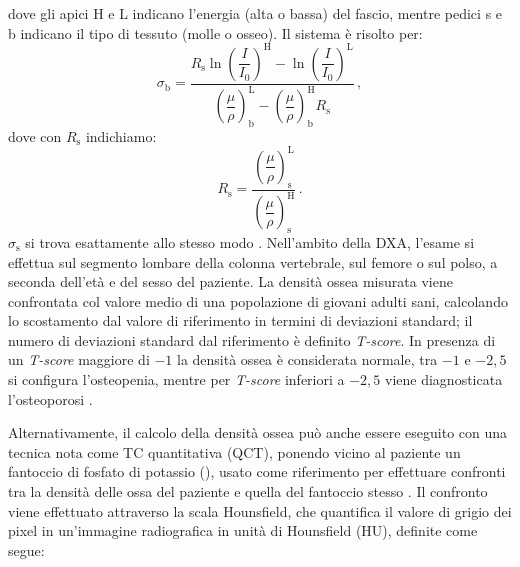 dove gli apici H e L indicano l'energia (alta o bassa) del fascio, mentre pedici s e b indicano il tipo di tessuto (molle o osseo). Il sistema è risolto per:
\begin{equation}
    \sigma_\mathrm{b} = \dfrac{R_\mathrm{s} \ln{\left(\dfrac{I}{I_0}\right)^\mathrm{H}}- \ln{\left(\dfrac{I}{I_0}\right)^\mathrm{L}}}{\left(\dfrac{\mu}{\rho}\right)^\mathrm{L}_\mathrm{b} - \left(\dfrac{\mu}{\rho}\right)^\mathrm{H}_\mathrm{b} R_\mathrm{s}}\,,
\end{equation}
dove con $R_\mathrm{s}$ indichiamo:
\begin{equation}
    R_\mathrm{s} = \dfrac{\left(\dfrac{\mu}{\rho}\right)^\mathrm{L}_\mathrm{s}}{\left(\dfrac{\mu}{\rho}\right)^\mathrm{H}_\mathrm{s}}\,.
\end{equation}
$\sigma_\mathrm{s}$ si trova esattamente allo stesso modo \cite[17-22]{iaea}. Nell'ambito della DXA, l'esame si effettua sul segmento lombare della colonna vertebrale, sul femore o sul polso, a seconda dell'età e del sesso del paziente. La densità ossea misurata viene confrontata col valore medio di una popolazione di giovani adulti sani, calcolando lo scostamento dal valore di riferimento in termini di deviazioni standard; il numero di deviazioni standard dal riferimento è definito \textit{T-score}. In presenza di un \textit{T-score} maggiore di $-1$ la densità ossea è considerata normale, tra $-1$ e $-2,5$ si configura l'osteopenia, mentre per \textit{T-score} inferiori a $-2,5$ viene diagnosticata l'osteoporosi \cite{siommms}.

Alternativamente, il calcolo della densità ossea può anche essere eseguito con una tecnica nota come TC quantitativa (QCT), ponendo vicino al paziente un fantoccio di fosfato di potassio (), usato come riferimento per effettuare confronti tra la densità delle ossa del paziente e quella del fantoccio stesso \cite{Murray2017}. Il confronto viene effettuato attraverso la scala Hounsfield, che quantifica il valore di grigio dei pixel in un’immagine radiografica in unità di Hounsfield (HU), definite come segue:

